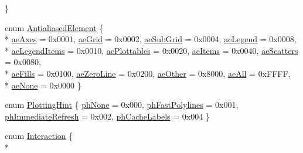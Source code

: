 \begin{DoxyCompactItemize}
 \}
\item 
enum \hyperlink{namespaceQCP_ae55dbe315d41fe80f29ba88100843a0c}{Antialiased\+Element} \{ \\*
\hyperlink{namespaceQCP_ae55dbe315d41fe80f29ba88100843a0caefa92e89cd37f8a081fd2075aa1af73f}{ae\+Axes} = 0x0001, 
\hyperlink{namespaceQCP_ae55dbe315d41fe80f29ba88100843a0ca4fbb37118d62288af0ca601ff2b07a2f}{ae\+Grid} = 0x0002, 
\hyperlink{namespaceQCP_ae55dbe315d41fe80f29ba88100843a0caaedf83369188a15a69f92bb1d85ca97b}{ae\+Sub\+Grid} = 0x0004, 
\hyperlink{namespaceQCP_ae55dbe315d41fe80f29ba88100843a0ca9e0127a6361b5d0596b031a482c5cf97}{ae\+Legend} = 0x0008, 
\\*
\hyperlink{namespaceQCP_ae55dbe315d41fe80f29ba88100843a0ca1aca7a50c1b95403958733a4acafe773}{ae\+Legend\+Items} = 0x0010, 
\hyperlink{namespaceQCP_ae55dbe315d41fe80f29ba88100843a0ca4145e4251b0cf2dbedabeea0a38f84f6}{ae\+Plottables} = 0x0020, 
\hyperlink{namespaceQCP_ae55dbe315d41fe80f29ba88100843a0caf7712a85d6b0c75b24301d2fe9484db3}{ae\+Items} = 0x0040, 
\hyperlink{namespaceQCP_ae55dbe315d41fe80f29ba88100843a0cae45ed8cd167bffe27d7f40da4bc17e9c}{ae\+Scatters} = 0x0080, 
\\*
\hyperlink{namespaceQCP_ae55dbe315d41fe80f29ba88100843a0ca788810f0aa930137de6ad6cc6d83d354}{ae\+Fills} = 0x0100, 
\hyperlink{namespaceQCP_ae55dbe315d41fe80f29ba88100843a0ca261f8ea78cf3c9561726223ffa33dc12}{ae\+Zero\+Line} = 0x0200, 
\hyperlink{namespaceQCP_ae55dbe315d41fe80f29ba88100843a0ca51dfdad36b2907277ae1221b09936441}{ae\+Other} = 0x8000, 
\hyperlink{namespaceQCP_ae55dbe315d41fe80f29ba88100843a0caa897c232a0ffc8368e7c100ffc59ef31}{ae\+All} = 0x\+F\+F\+FF, 
\\*
\hyperlink{namespaceQCP_ae55dbe315d41fe80f29ba88100843a0caa9e90d81896358757d94275aeaa58f6a}{ae\+None} = 0x0000
 \}
\item 
enum \hyperlink{namespaceQCP_a5400e5fcb9528d92002ddb938c1f4ef4}{Plotting\+Hint} \{ \hyperlink{namespaceQCP_a5400e5fcb9528d92002ddb938c1f4ef4ab7283c5bfc1ba9e597015389880bda42}{ph\+None} = 0x000, 
\hyperlink{namespaceQCP_a5400e5fcb9528d92002ddb938c1f4ef4aa5fd227bc878c56ad2a87ea32c74ee4d}{ph\+Fast\+Polylines} = 0x001, 
\hyperlink{namespaceQCP_a5400e5fcb9528d92002ddb938c1f4ef4a30840fba10eebfa519a92cf5c3d32870}{ph\+Immediate\+Refresh} = 0x002, 
\hyperlink{namespaceQCP_a5400e5fcb9528d92002ddb938c1f4ef4a8e9cfe5ee0c5cd36dd7accf9739aff65}{ph\+Cache\+Labels} = 0x004
 \}
\item 
enum \hyperlink{namespaceQCP_a2ad6bb6281c7c2d593d4277b44c2b037}{Interaction} \{ \\*

\end{DoxyCompactItemize}

